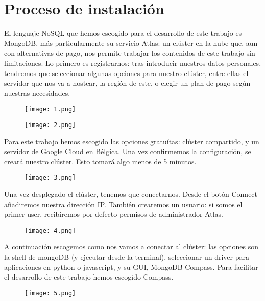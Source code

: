 \chapter{Proceso de instalación}

El lenguaje NoSQL que hemos escogido para el desarrollo de este trabajo es MongoDB, más particularmente su servicio Atlas: un clúster en la nube que, aun con alternativas de pago, nos permite trabajar los contenidos de este trabajo sin limitaciones.
Lo primero es registrarnos: tras introducir nuestros datos personales, tendremos que seleccionar algunas opciones para nuestro clúster, entre ellas el servidor que nos va a hostear, la región de este, o elegir un plan de pago según nuestras necesidades.

\begin{figure}[!h]
  \centering
    \texttt{[image: 1.png]}
\end{figure}

\begin{figure}[!h]
  \centering
    \texttt{[image: 2.png]}
\end{figure}

\pagebreak
Para este trabajo hemos escogido las opciones gratuítas: clúster compartido, y un servidor de Google Cloud en Bélgica. Una vez confirmemos la configuración, se creará nuestro clúster. Esto tomará algo menos de 5 minutos.

\begin{figure}[!h]
  \centering
    \texttt{[image: 3.png]}
\end{figure}

Una vez desplegado el clúster, tenemos que conectarnos. Desde el botón Connect añadiremos nuestra dirección IP. También crearemos un usuario: si somos el primer user, recibiremos por defecto permisos de administrador Atlas.

\begin{figure}[!h]
  \centering
    \texttt{[image: 4.png]}
\end{figure}

\pagebreak
A continuación escogemos como nos vamos a conectar al clúster: las opciones son la shell de mongoDB (y ejecutar desde la terminal), seleccionar un driver para aplicaciones en python o javascript, y su GUI, MongoDB Compass. Para facilitar el desarrollo de este trabajo hemos escogido Compass.

\begin{figure}[!h]
  \centering
    \texttt{[image: 5.png]}
\end{figure}

